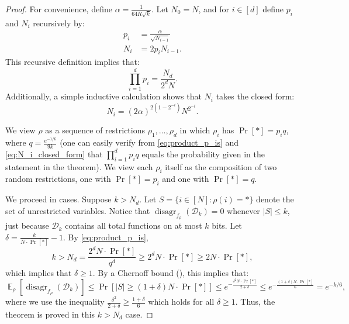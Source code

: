\documentclass[11pt]{article}%
\newcommand{\E}{\mathop{\mathbb{E}}}
\DeclareMathOperator{\disagr}{\mathrm{disagr}}
\begin{document}
\begin{proof}
For convenience, define $\alpha = \frac{1}{64R\sqrt{k}}$. Let $N_0 = N$, and for $i \in [d]$ define $p_i$ and $N_i$ recursively by:
\begin{align*}
p_i &= \frac{\alpha}{\sqrt{N_{i-1}}}\\
N_i &= 2p_iN_{i-1}.
\end{align*}
This recursive definition implies that:
\begin{equation}
\label{eq:product_p_is}
\prod_{i=1}^d p_i = \frac{N_d}{2^dN}.
\end{equation}
Additionally, a simple inductive calculation shows that $N_i$ takes the closed form:
\begin{equation}
\label{eq:N_i_closed_form}
N_i = (2\alpha)^{2(1 - 2^{-i})} N^{2^{-i}}.
\end{equation}

We view $\rho$ as a sequence of restrictions $\rho_1,\ldots,\rho_d$ in which $\rho_i$ has $\Pr[*] = p_iq$, where $q = \frac{e^{-1/6}}{9k}$ (one can easily verify from \eqref{eq:product_p_is} and \eqref{eq:N_i_closed_form} that $\prod_{i=1}^d p_iq$ equals the probability given in the statement in the theorem). We view each $\rho_i$ itself as the composition of two random restrictions, one with $\Pr[*] = p_i$ and one with $\Pr[*] = q$.

We proceed in cases. Suppose $k > N_d$. Let $S = \{i \in [N]: \rho(i) = *\}$ denote the set of unrestricted variables. Notice that $\disagr_{f_\rho}\left(\mathcal{D}_k\right) = 0$ whenever $|S| \le k$, just because $\mathcal{D}_k$ contains all total functions on at most $k$ bits. Let $\delta = \frac{k}{N\cdot\Pr[*]} - 1$. By \eqref{eq:product_p_is},
\[
k > N_d = \frac{2^d N\cdot\Pr[*]}{q^d} \ge 2^d N\cdot\Pr[*] \ge 2N\cdot\Pr[*],
\]
which implies that $\delta \ge 1$. By a Chernoff bound (), this implies that:
\[
\E_\rho\left[\disagr_{f_\rho}\left(\mathcal{D}_k\right)\right] \le \Pr\left[|S| \ge (1 + \delta)N\cdot\Pr[*]\right] \le e^{-\frac{\delta^2 N\cdot\Pr[*]}{2 + \delta}} \le e^{-\frac{(1 + \delta) N\cdot\Pr[*]}{6}} = e^{-k/6},
\]
where we use the inequality $\frac{\delta^2}{2+\delta} \ge \frac{1 + \delta}{6}$ which holds for all $\delta \ge 1$. Thus, the theorem is proved in this $k > N_d$ case.


\end{proof}
\end{document}
